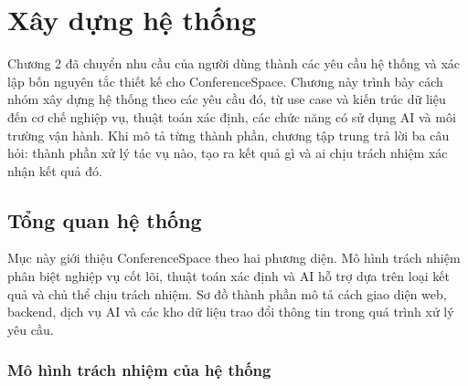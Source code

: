 \chapter{Xây dựng hệ thống}
\label{Chapter3}

Chương 2 đã chuyển nhu cầu của người dùng thành các yêu cầu hệ thống và xác lập bốn nguyên tắc thiết kế cho ConferenceSpace. Chương này trình bày cách nhóm xây dựng hệ thống theo các yêu cầu đó, từ use case và kiến trúc dữ liệu đến cơ chế nghiệp vụ, thuật toán xác định, các chức năng có sử dụng AI và môi trường vận hành. Khi mô tả từng thành phần, chương tập trung trả lời ba câu hỏi: thành phần xử lý tác vụ nào, tạo ra kết quả gì và ai chịu trách nhiệm xác nhận kết quả đó.

\section{Tổng quan hệ thống}

Mục này giới thiệu ConferenceSpace theo hai phương diện. Mô hình trách nhiệm phân biệt nghiệp vụ cốt lõi, thuật toán xác định và AI hỗ trợ dựa trên loại kết quả và chủ thể chịu trách nhiệm. Sơ đồ thành phần mô tả cách giao diện web, backend, dịch vụ AI và các kho dữ liệu trao đổi thông tin trong quá trình xử lý yêu cầu.

\subsection{Mô hình trách nhiệm của hệ thống}

